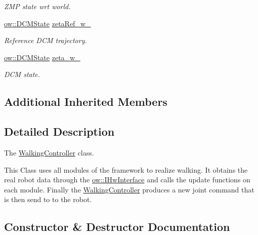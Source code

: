\begin{DoxyCompactItemize}
\begin{DoxyCompactList}\small\item\em Z\+MP state wrt world. \end{DoxyCompactList}\item 
\hyperlink{classow__core_1_1DivergentComponentOfMotionState}{ow\+::\+D\+C\+M\+State} \hyperlink{classow__controller_1_1WalkingController_aa767ae06d46e09db3ea8ca088519fb06}{zeta\+Ref\+\_\+w\+\_\+}\hypertarget{classow__controller_1_1WalkingController_aa767ae06d46e09db3ea8ca088519fb06}{}\label{classow__controller_1_1WalkingController_aa767ae06d46e09db3ea8ca088519fb06}

\begin{DoxyCompactList}\small\item\em Reference D\+CM trajectory. \end{DoxyCompactList}\item 
\hyperlink{classow__core_1_1DivergentComponentOfMotionState}{ow\+::\+D\+C\+M\+State} \hyperlink{classow__controller_1_1WalkingController_ad57330be75d8d0056813c15f4bd4682f}{zeta\+\_\+w\+\_\+}\hypertarget{classow__controller_1_1WalkingController_ad57330be75d8d0056813c15f4bd4682f}{}\label{classow__controller_1_1WalkingController_ad57330be75d8d0056813c15f4bd4682f}

\begin{DoxyCompactList}\small\item\em D\+CM state. \end{DoxyCompactList}\end{DoxyCompactItemize}
\subsection*{Additional Inherited Members}


\subsection{Detailed Description}
The \hyperlink{classow__controller_1_1WalkingController}{Walking\+Controller} class. 

This Class uses all modules of the framework to realize walking. It obtains the real robot data through the \hyperlink{classow_1_1IHwInterface}{ow\+::\+I\+Hw\+Interface} and calls the update functions on each module. Finally the \hyperlink{classow__controller_1_1WalkingController}{Walking\+Controller} produces a new joint command that is then send to to the robot. 

\subsection{Constructor \& Destructor Documentation}
